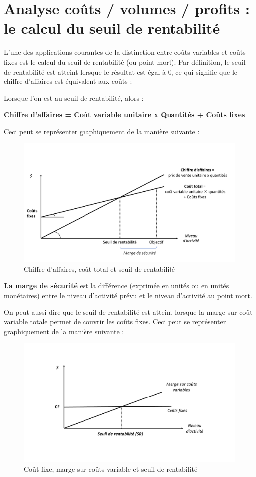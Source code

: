 \documentclass[oneside]{kaobook}
\begin{document}
\section{Analyse coûts / volumes / profits : le calcul du seuil de rentabilité}
\label{sec:orgeb51389}
L'une des applications courantes de la distinction entre coûts variables et coûts fixes est le calcul du seuil de rentabilité (ou point mort). 
Par définition, le seuil de rentabilité est atteint lorsque le résultat est égal à 0, ce qui signifie que le chiffre d'affaires est équivalent aux coûts :
\begin{center}
Lorsque l'on est au seuil de rentabilité, alors :

\textbf{Chiffre d'affaires = Coût variable unitaire x Quantités + Coûts fixes}
\end{center}
Ceci peut se représenter graphiquement de la manière suivante :
\begin{figure}[H]

\includegraphics{./img/srcact.pdf}
\caption{Chiffre d'affaires, coût total et seuil de rentabilité}
\end{figure}
\textbf{La marge de sécurité} est la différence (exprimée en unités ou en unités monétaires) entre le niveau d'activité prévu et le niveau d'activité au point mort.

On peut aussi dire que le seuil de rentabilité est atteint lorsque la marge sur coût variable totale permet de couvrir les coûts fixes. 
Ceci peut se représenter graphiquement de la manière suivante :
\begin{figure}[H]

\includegraphics{./img/srmcvcf.pdf}
\caption{Coût fixe, marge sur coûts variable et seuil de rentabilité}
\end{figure}
\end{document}
